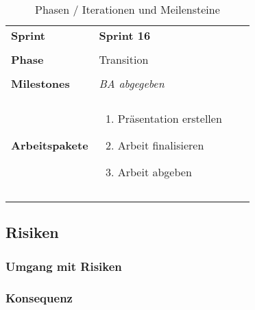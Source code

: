 \begin{landscape}
\begin{longtable}{l p{5.5cm} p{5.5cm} p{5.5cm}}
        \toprule
        \textbf{Sprint}
                                & \textbf{Sprint 16}
                                & \\
                                & \\

        \midrule
        \textbf{Phase}
                                & Transition
                                & \\
                                & \\

        \textbf{Milestones}
                                & \textit{BA abgegeben}
                                & \\
                                &  \\

        \textbf{Arbeitspakete}
                                & \begin{enumerate}[noitemsep]
                                    \item Präsentation erstellen
                                    \item Arbeit finalisieren
                                    \item Arbeit abgeben

                                \end{enumerate}
                                & \\
                                & \\
        \bottomrule
    \caption{Phasen / Iterationen und Meilensteine}
    \label{table:Phasen / Iterationen und Meilensteine}
\end{longtable}
\end{landscape}


\subsection{Risiken}
\label{Projektmanagement:Risiken}



\subsubsection{Umgang mit Risiken}
\label{Risiken:Umang mit Risiken}


\subsubsection{Konsequenz}
\label{Risiken:Konsequenz}

